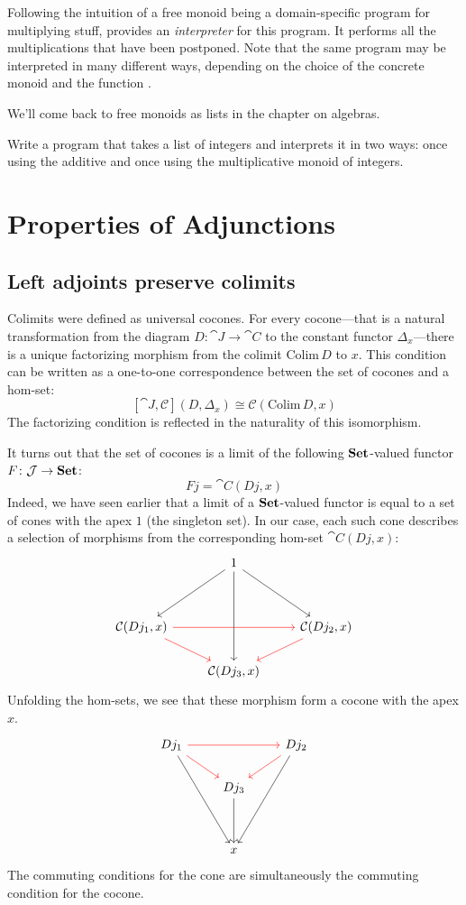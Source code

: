 \documentclass[DaoFP]{subfiles}
\begin{document}
Following the intuition of a free monoid being a domain-specific program for multiplying stuff,  provides an \emph{interpreter} for this program. It performs all the multiplications that have been postponed. Note that the same program may be interpreted in many different ways, depending on the choice of the concrete monoid and the function .

We'll come back to free monoids as lists in the chapter on algebras.

\begin{exercise}
Write a program that takes a list of integers and interprets it in two ways: once using the additive and once using the multiplicative monoid of integers.
\end{exercise}

\section{Properties of Adjunctions}

\subsection{Left adjoints preserve colimits}

Colimits were defined as universal cocones. For every cocone---that is a natural transformation from the diagram $D \colon \cat J \to \cat C$ to the constant functor $\Delta_x$---there is a unique factorizing morphism from the colimit $\text{Colim}\, D$ to $x$. This condition can be written as a one-to-one correspondence between the set of cocones and a hom-set:
\[ [\cat J, \mathcal{C}](D, \Delta_x)  \cong \mathcal{C}( \text{Colim} \, D, x) \]
The factorizing condition is reflected in the naturality of this isomorphism.

It turns out that the set of cocones is a limit of the following $\mathbf{Set}$-valued functor $F \colon \mathcal{J} \to \mathbf{Set}$:
\[ F j = \cat C(D j, x) \]
Indeed, we have seen earlier that a limit of a $\mathbf{Set}$-valued functor is equal to a set of cones with the apex $1$ (the singleton set). In our case, each such cone describes a selection of morphisms from the corresponding hom-set $\cat C(D j, x)$:
\[
 \begin{tikzcd}
  & 1
\arrow[ddr, ""]
 \arrow[ddl, ""']
 \arrow[ddd, ""]
 \\
\\
\cat C( D j_1, x)
\arrow[rr, red]
\arrow[rd, red]
&& \cat C( D j_2, x)
\arrow[dl, red]
\\
& \cat C( D j_3, x)
 \end{tikzcd}
\]
Unfolding the hom-sets, we see that these morphism form a cocone with the apex $x$. 
\[
\begin{tikzcd}
 D j_1
 \arrow[rr, red]
 \arrow[dr, red]
 \arrow[dddr, ""']
 && D j_2
\arrow[dl, red]
 \arrow[dddl, ""]
 \\
 & D j_3
 \arrow[dd, ""]
 \\
 \\
 & x
 \end{tikzcd}
 \]
The commuting conditions for the cone are simultaneously the commuting condition for the cocone.
\end{document}
